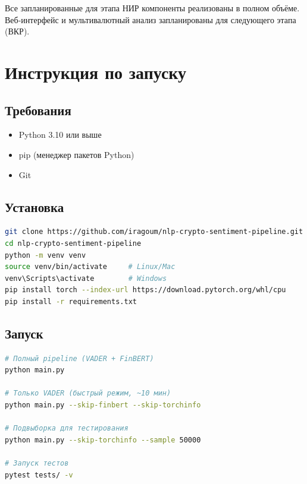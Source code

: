 \documentclass[a4paper,12pt]{article}
\begin{document}
Все запланированные для этапа НИР компоненты реализованы в полном объёме.
Веб-интерфейс и мультивалютный анализ запланированы для следующего этапа (ВКР).


\section{Инструкция по запуску}

\subsection{Требования}

\begin{itemize}
  \item Python 3.10 или выше
  \item pip (менеджер пакетов Python)
  \item Git
\end{itemize}

\subsection{Установка}

\begin{lstlisting}[language=bash, caption={Установка зависимостей}]
git clone https://github.com/iragoum/nlp-crypto-sentiment-pipeline.git
cd nlp-crypto-sentiment-pipeline
python -m venv venv
source venv/bin/activate     # Linux/Mac
venv\Scripts\activate        # Windows
pip install torch --index-url https://download.pytorch.org/whl/cpu
pip install -r requirements.txt
\end{lstlisting}

\subsection{Запуск}

\begin{lstlisting}[language=bash, caption={Команды запуска}]
# Полный pipeline (VADER + FinBERT)
python main.py

# Только VADER (быстрый режим, ~10 мин)
python main.py --skip-finbert --skip-torchinfo

# Подвыборка для тестирования
python main.py --skip-torchinfo --sample 50000

# Запуск тестов
pytest tests/ -v
\end{lstlisting}
\end{document}
